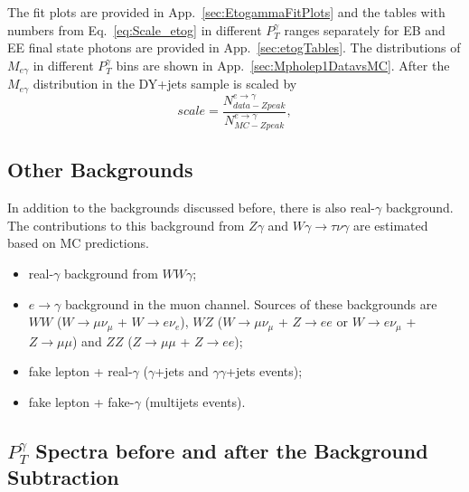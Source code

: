 The fit plots are provided in App.~\ref{sec:EtogammaFitPlots} and the tables with numbers from Eq.~\ref{eq:Scale_etog} in different $P_T^{\gamma}$ ranges separately for EB and EE final state photons are provided in App.~\ref{sec:etogTables}. The distributions of $M_{e\gamma}$ in different $P_T^{\gamma}$ bins are shown in App.~\ref{sec:Mpholep1DatavsMC}. After the $M_{e\gamma}$ distribution in the DY+jets sample is scaled by 
\begin{equation}
   scale = \frac{N_{data-Zpeak}^{e\rightarrow\gamma}}{N_{MC-Zpeak}^{e\rightarrow\gamma}},
\end{equation}



\subsection{Other Backgrounds}

In addition to the backgrounds discussed before, there is also real-$\gamma$ background. The contributions to this background from $Z\gamma$ and $W\gamma \rightarrow \tau \nu \gamma$ are estimated based on MC predictions.

\begin{itemize}
   \item real-$\gamma$ background from $WW\gamma$;  
   \item $e \rightarrow \gamma$ background in the muon channel. Sources of these backgrounds are $WW$ ($W \rightarrow \mu\nu_{\mu}$ + $W \rightarrow e\nu_e$), $WZ$ ($W \rightarrow \mu\nu_{\mu}$ + $Z \rightarrow ee$ or $W \rightarrow e\nu_{\mu}$ + $Z \rightarrow \mu\mu$) and $ZZ$ ($Z \rightarrow \mu\mu$ + $Z \rightarrow ee$);
   \item fake lepton + real-$\gamma$ ($\gamma$+jets and $\gamma\gamma$+jets events); 
   \item fake lepton + fake-$\gamma$ (multijets events).  
\end{itemize}

\subsection{$P_T^{\gamma}$ Spectra before and after the Background Subtraction}

